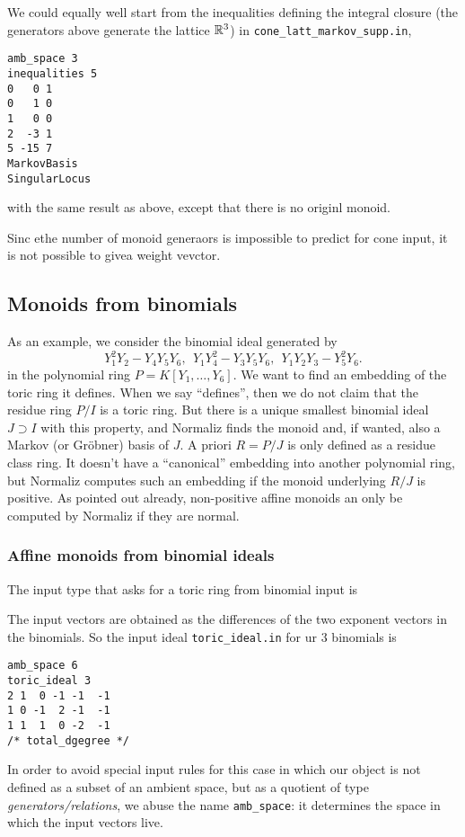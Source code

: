 We could equally well start from the inequalities defining the integral closure (the generators above generate the lattice ${\mathbb R}^3$) in \verb|cone_latt_markov_supp.in|,
\begin{Verbatim}
amb_space 3
inequalities 5
0   0 1
0   1 0
1   0 0
2  -3 1
5 -15 7
MarkovBasis
SingularLocus
\end{Verbatim}
with the same result as above, except that there is no originl monoid.

Sinc ethe number of monoid generaors is impossible to predict for cone input, it is not possible to givea weight vevctor.

\subsection{Monoids from binomials}\label{binom_ex}

As an example, we consider the binomial ideal generated by
$$
Y_1^2Y_2-Y_4Y_5Y_6,\ \ Y_1Y_4^2-Y_3Y_5Y_6,\ \ Y_1Y_2Y_3-Y_5^2Y_6.
$$
in the polynomial ring $P=K[Y_1,\dots, Y_6]$. We want to find an embedding of the toric ring it defines. When we say ``defines'', then we do not claim that the residue ring  $P/I$ is a toric ring. But there is a unique smallest binomial ideal $J\supset I$ with this property, and Normaliz finds the monoid and, if wanted, also a Markov (or Gröbner) basis of $J$. A priori $R=P/J$ is only defined as a residue class ring. It doesn't have a ``canonical'' embedding into another polynomial ring, but Normaliz computes such an embedding if the monoid underlying $R/J$ is positive. As pointed out already, non-positive affine monoids an only be computed by Normaliz if they are normal.

\subsubsection{Affine monoids from binomial ideals}\label{toric_ideal}
The input type that asks for a toric ring from binomial input is
\begin{itemize}
\end{itemize}
The input vectors are obtained as the differences of the two exponent vectors in the binomials. So the input ideal \verb+toric_ideal.in+ for ur $3$ binomials is
\begin{Verbatim}
amb_space 6
toric_ideal 3
2 1  0 -1 -1  -1
1 0 -1  2 -1  -1
1 1  1  0 -2  -1
/* total_dgegree */
\end{Verbatim}
In order to avoid special input rules for this case in which our object is not defined as a subset of an ambient space, but as a quotient of type \emph{generators/relations}, we abuse the name \verb|amb_space|: it determines the space in which the input vectors live.

